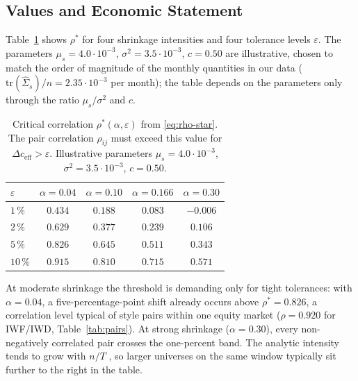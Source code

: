 \documentclass[a4paper,11pt]{article}
\theoremstyle{plain}
\theoremstyle{definition}
\newcommand{\eff}{\mathrm{eff}}
\begin{document}
\subsection{Values and Economic Statement}
\label{sec:values}

Table~\ref{tab:rho-star} shows $\rho^*$ for four shrinkage intensities
and four tolerance levels $\varepsilon$. The parameters $\mu_s = 4.0\cdot
10^{-3}$, $\sigma^2 = 3.5\cdot 10^{-3}$, $c = 0.50$ are illustrative,
chosen to match the order of magnitude of the monthly quantities in our data
($\mathrm{tr}(\hat\Sigma_s)/n = 2.35\cdot 10^{-3}$ per month); the table
depends on the parameters only through the ratio $\mu_s/\sigma^2$
and $c$.

\begin{table}[H]
\centering
\caption{Critical correlation $\rho^*(\alpha,\varepsilon)$ from
\eqref{eq:rho-star}. The pair correlation $\rho_{ij}$ must exceed this
value for $\Delta c_{\eff} > \varepsilon$. Illustrative parameters
$\mu_s = 4.0\cdot 10^{-3}$, $\sigma^2 = 3.5\cdot 10^{-3}$, $c = 0.50$.}
\label{tab:rho-star}
\begin{tabular}{lcccc}
\toprule
$\varepsilon$ & $\alpha = 0.04$ & $\alpha = 0.10$ & $\alpha = 0.166$ & $\alpha = 0.30$ \\
\midrule
$1\,\%$  & $0.434$ & $0.188$ & $0.083$ & $-0.006$ \\
$2\,\%$  & $0.629$ & $0.377$ & $0.239$ & $0.106$ \\
$5\,\%$  & $0.826$ & $0.645$ & $0.511$ & $0.343$ \\
$10\,\%$ & $0.915$ & $0.810$ & $0.715$ & $0.571$ \\
\bottomrule
\end{tabular}
\end{table}

At moderate shrinkage the threshold is demanding only for tight
tolerances: with $\alpha = 0.04$, a five-percentage-point shift already
occurs above $\rho^* = 0.826$, a correlation level typical of style
pairs within one equity market ($\rho = 0.920$ for IWF/IWD,
Table~\ref{tab:pairs}). At strong shrinkage ($\alpha = 0.30$),
every non-negatively correlated pair crosses the one-percent band. The
analytic intensity tends to grow with $n/T$ \citep{LedoitWolf2004}, so
larger universes on the same window typically sit further to the right
in the table.
\end{document}
